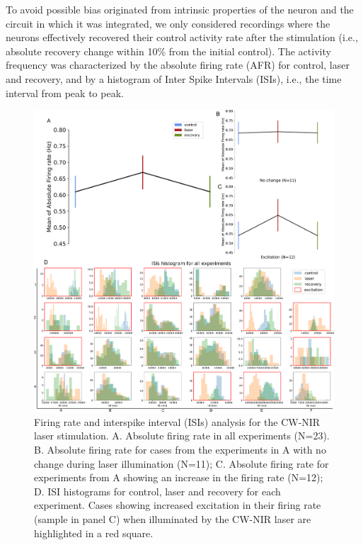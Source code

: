 To avoid possible bias originated from intrinsic properties of the neuron and the circuit in which it was integrated, we only considered recordings where the neurons effectively recovered their control activity rate after the stimulation (i.e., absolute recovery change within 10\% from the initial control). The activity frequency was characterized by the absolute firing rate (AFR) for control, laser and recovery, and by a histogram of Inter Spike Intervals (ISIs), i.e., the time interval from peak to peak.

\begin{figure}[hb!]
	\centering
	\includegraphics[width=\textwidth]{img/laser/Figure3.pdf}
	\caption{Firing rate and interspike interval (ISIs) analysis for the CW-NIR laser stimulation. A. Absolute firing rate in all experiments (N=23). B. Absolute firing rate for cases from the experiments in A with no change during laser illumination (N=11); C. Absolute firing rate for experiments from A showing an increase in the firing rate (N=12); D. ISI histograms for control, laser and recovery for each experiment. Cases showing increased excitation in their firing rate (sample in panel C) when illuminated by the CW-NIR laser are highlighted in a red square.}
	\label{fig:frequency FR}
\end{figure}


